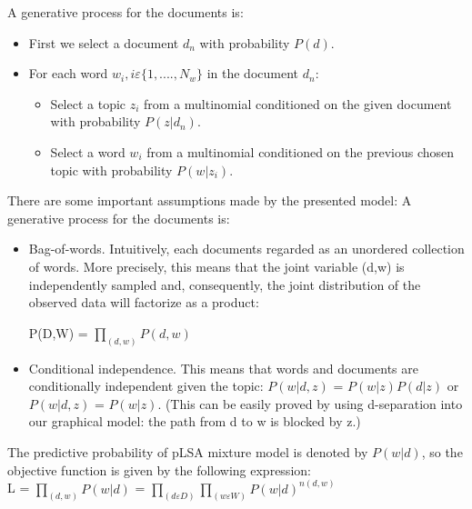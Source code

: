 \documentclass{article}
\begin{document}
A generative process for the documents is:
\begin{itemize}
\item First we select a document \ensuremath {d_{n}} with probability \ensuremath{P(d)}.
\item For each word \ensuremath {w_{i}, i {\varepsilon} \{1,. . . .,N_{w}\}} in the document \ensuremath{d_{n}}:
\begin{itemize}
\item Select a topic \ensuremath{z_{i}} from a multinomial conditioned on the given document with probability \ensuremath {P(z|d_{n})}.
\item Select a word \ensuremath{w_{i}} from a multinomial conditioned on the previous chosen topic with probability \ensuremath {P(w|z_{i})}.
\end{itemize}
\end{itemize}

There are some important assumptions made by the presented model:
A generative process for the documents is:

\begin{itemize}
\item Bag-of-words. Intuitively, each documents regarded as an unordered collection of words. More precisely, this means that the joint variable (d,w) is independently sampled and, consequently, the joint distribution of the observed data will factorize
as a product:\\ 
\begin{center} P(D,W) = \ensuremath{\prod_{(d,w)} P(d,w)} \end{center}
\item Conditional independence. This means that words and documents are conditionally independent given the topic:
\ensuremath {P(w|d,z)} = \ensuremath {P(w|z)P(d|z)} or \ensuremath {P(w|d,z)} = \ensuremath{P(w|z)}. (This can be easily proved by using d-separation into our graphical model: the path from d to w is blocked by z.)
\end{itemize}
The predictive probability of pLSA mixture model is denoted by \ensuremath{P(w|d)}, so the objective function is given by the following expression:\\ L = \ensuremath{\prod_{(d,w)} P(w|d)} = \ensuremath{\prod_{(d \ensuremath{\varepsilon} D)}\prod_{(w \ensuremath{\varepsilon} W)} P(w|d)^{n(d,w)}}\newline \\
\end{document}
